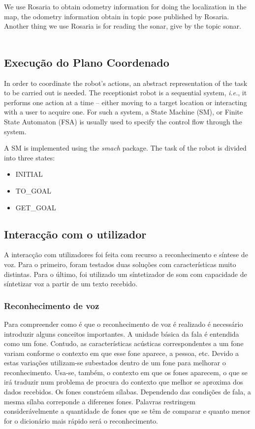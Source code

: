 \documentclass[journal]{IEEEtran}
\begin{document}
	We use Rosaria to obtain odometry information for doing the localization in the map, the odometry information obtain in topic pose published by Rosaria.
	Another thing we use Rosaria is for reading the sonar, give by the topic sonar.
	\\
	\\

\subsection{Execução do Plano Coordenado}


In order to coordinate the robot's actions, an abstract representation of the task to be carried out is needed. The receptionist robot is a sequential system, \textit{i.e.}, it performs one action at a time -- either moving to a target location or interacting with a user to acquire one. For such a system, a State Machine (SM), or Finite State Automaton (FSA) is usually used to specify the control flow through the system.

A SM is implemented using the \textit{smach} package. The task of the robot is divided into three states:
\begin{itemize}
	\item INITIAL
	\item TO\_GOAL
	\item GET\_GOAL
\end{itemize}

\subsection{Interacção com o utilizador}

A interacção com utilizadores foi feita com recurso a reconhecimento e síntese de voz. Para o primeiro, foram testados duas soluções com características muito distintas. Para o último, foi utilizado um síntetizador de som com capacidade de síntetizar voz a partir de um texto recebido.

\subsubsection{Reconhecimento de voz}

Para compreender como é que o reconhecimento de voz é realizado é necessário introduzir alguns conceitos importantes. A unidade básica da fala é entendida como um fone. Contudo, as características acústicas correspondentes a um fone variam conforme o contexto em que esse fone aparece, a pessoa, etc. Devido a estas variações  utilizam-se subestados dentro de um fone para melhorar o reconhecimento. Usa-se, também, o contexto em que os fones aparecem, o que se irá traduzir num problema de procura do contexto que melhor se aproxima dos dados recebidos. Os fones constróem sílabas. Dependendo das condições de fala, a mesma sílaba correponde a diferenes fones. Palavras restringem considerávelmente a quantidade de fones que se têm de comparar e quanto menor for o dicionário mais rápido será o reconhecimento.
\end{document}
